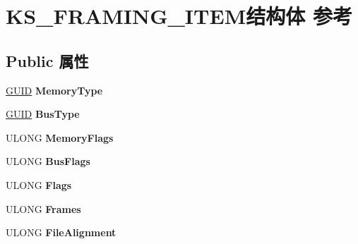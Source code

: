 \hypertarget{struct_k_s___f_r_a_m_i_n_g___i_t_e_m}{}\section{K\+S\+\_\+\+F\+R\+A\+M\+I\+N\+G\+\_\+\+I\+T\+E\+M结构体 参考}
\label{struct_k_s___f_r_a_m_i_n_g___i_t_e_m}
\subsection*{Public 属性}
\begin{DoxyCompactItemize}
\item 
\mbox{\label{struct_k_s___f_r_a_m_i_n_g___i_t_e_m_a5423848afda740337946226d341e6b86}} 
\hyperlink{interface_g_u_i_d}{G\+U\+ID} {\bfseries Memory\+Type}
\item 
\mbox{\label{struct_k_s___f_r_a_m_i_n_g___i_t_e_m_adb188ca27e6bf1aa7401af7c83d18f4b}} 
\hyperlink{interface_g_u_i_d}{G\+U\+ID} {\bfseries Bus\+Type}
\item 
\mbox{\label{struct_k_s___f_r_a_m_i_n_g___i_t_e_m_a2e213c10a840ac1d24cced20c24a2894}} 
U\+L\+O\+NG {\bfseries Memory\+Flags}
\item 
\mbox{\label{struct_k_s___f_r_a_m_i_n_g___i_t_e_m_a53ad79998621b3806e74febc8ee19ecd}} 
U\+L\+O\+NG {\bfseries Bus\+Flags}
\item 
\mbox{\label{struct_k_s___f_r_a_m_i_n_g___i_t_e_m_ad511f9aa589a6ffb5484558730cfe92d}} 
U\+L\+O\+NG {\bfseries Flags}
\item 
\mbox{\label{struct_k_s___f_r_a_m_i_n_g___i_t_e_m_a324ce02a53180de95a598e153c474dea}} 
U\+L\+O\+NG {\bfseries Frames}
\item 
\mbox{\label{struct_k_s___f_r_a_m_i_n_g___i_t_e_m_ae6a905a4ce7f06859fe6b0d4fb9af782}} 
U\+L\+O\+NG {\bfseries File\+Alignment}
\item 
\mbox{\label{struct_k_s___f_r_a_m_i_n_g___i_t_e_m_a52c977fa93d968fb8e8c1286854690b7}} 

\end{DoxyCompactItemize}
